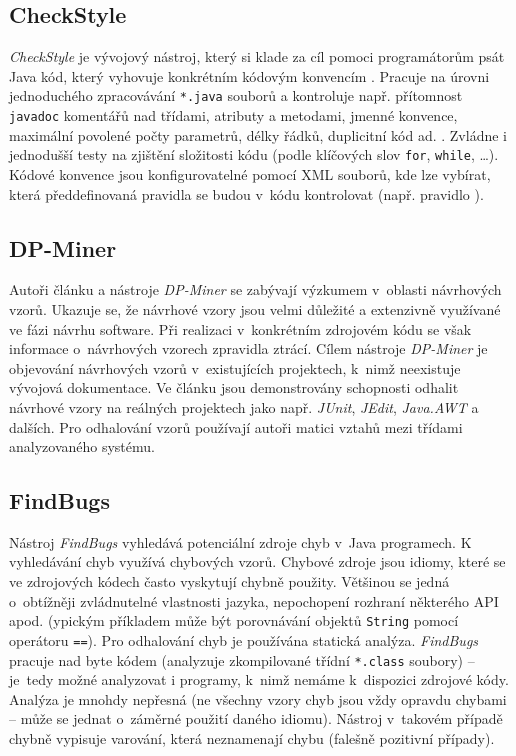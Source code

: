 \subsection{CheckStyle}
\emph{CheckStyle} je vývojový nástroj, který si klade za cíl pomoci programátorům psát Java kód, který vyhovuje konkrétním kódovým konvencím \cite{existingtools:checkstyle}. Pracuje na úrovni jednoduchého zpracovávání \verb+*.java+ souborů a kontroluje např. přítomnost \verb+javadoc+ komentářů nad třídami, atributy a metodami, jmenné konvence, maximální povolené počty parametrů, délky řádků, duplicitní kód ad. \cite{existingtools:checkstyle-wiki}. Zvládne i jednodušší testy na zjištění složitosti kódu (podle klíčových slov \verb+for+, \verb+while+, \ldots). Kódové konvence jsou konfigurovatelné pomocí XML souborů, kde lze vybírat, která předdefinovaná pravidla se budou v~kódu kontrolovat (např. pravidlo \mbox{}).

\subsection{DP-Miner}
Autoři článku \cite{4273268} a nástroje \emph{DP-Miner} \cite{existingtools:dp-miner} se zabývají výzkumem v~oblasti návrhových vzorů. Ukazuje se, že návrhové vzory jsou velmi důležité a extenzivně využívané ve fázi návrhu software. Při realizaci v~konkrétním zdrojovém kódu se však informace o~návrhových vzorech zpravidla ztrácí. Cílem nástroje \emph{DP-Miner} je objevování návrhových vzorů v~existujících projektech, k~nimž neexistuje vývojová dokumentace. Ve článku \cite{4273268} jsou demonstrovány schopnosti odhalit návrhové vzory na reálných projektech jako např. \emph{JUnit}, \emph{JEdit}, \emph{Java.AWT} a dalších. Pro odhalování vzorů používají autoři matici vztahů mezi třídami analyzovaného systému.

\subsection{FindBugs}
Nástroj \emph{FindBugs} \cite{existingtools:findbugs} vyhledává potenciální zdroje chyb v~Java programech. K vyhledávání chyb využívá chybových vzorů. Chybové zdroje jsou idiomy, které se ve zdrojových kódech často vyskytují chybně použity. Většinou se jedná o~obtížněji zvládnutelné vlastnosti jazyka, nepochopení rozhraní některého API apod. (ypickým příkladem může být porovnávání objektů \verb+String+ pomocí operátoru \verb+==+). Pro odhalování chyb je používána statická analýza. \emph{FindBugs} pracuje nad byte kódem (analyzuje zkompilované třídní \verb-*.class- soubory) -- \mbox{je tedy} možné analyzovat i programy, k~nimž nemáme k~dispozici zdrojové kódy. Analýza je mnohdy nepřesná (ne všechny vzory chyb jsou vždy opravdu chybami -- může se jednat o~záměrné použití daného idiomu). Nástroj v~takovém případě chybně vypisuje varování, která neznamenají chybu (falešně pozitivní případy).

